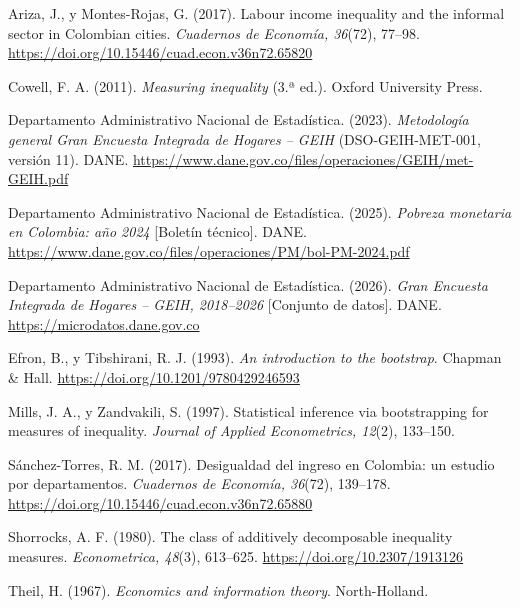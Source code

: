 \documentclass[12pt,letterpaper]{article}
\newenvironment{referencias}{\begin{list}{}{\setlength{\leftmargin}{0.5in}\setlength{\itemindent}{-0.5in}\setlength{\itemsep}{0pt}\setlength{\parsep}{0pt}}\raggedright}{\end{list}}
\begin{document}
\begin{referencias}
  \item Ariza, J., y Montes-Rojas, G. (2017). Labour income inequality and the informal sector in Colombian cities. \emph{Cuadernos de Economía, 36}(72), 77--98. \url{https://doi.org/10.15446/cuad.econ.v36n72.65820}
  \item Cowell, F. A. (2011). \emph{Measuring inequality} (3.ª ed.). Oxford University Press.
  \item Departamento Administrativo Nacional de Estadística. (2023). \emph{Metodología general Gran Encuesta Integrada de Hogares -- GEIH} (DSO-GEIH-MET-001, versión 11). DANE. \url{https://www.dane.gov.co/files/operaciones/GEIH/met-GEIH.pdf}
  \item Departamento Administrativo Nacional de Estadística. (2025). \emph{Pobreza monetaria en Colombia: año 2024} [Boletín técnico]. DANE. \url{https://www.dane.gov.co/files/operaciones/PM/bol-PM-2024.pdf}
  \item Departamento Administrativo Nacional de Estadística. (2026). \emph{Gran Encuesta Integrada de Hogares -- GEIH, 2018--2026} [Conjunto de datos]. DANE. \url{https://microdatos.dane.gov.co}
  \item Efron, B., y Tibshirani, R. J. (1993). \emph{An introduction to the bootstrap}. Chapman \& Hall. \url{https://doi.org/10.1201/9780429246593}
  \item Mills, J. A., y Zandvakili, S. (1997). Statistical inference via bootstrapping for measures of inequality. \emph{Journal of Applied Econometrics, 12}(2), 133--150.
  \item Sánchez-Torres, R. M. (2017). Desigualdad del ingreso en Colombia: un estudio por departamentos. \emph{Cuadernos de Economía, 36}(72), 139--178. \url{https://doi.org/10.15446/cuad.econ.v36n72.65880}
  \item Shorrocks, A. F. (1980). The class of additively decomposable inequality measures. \emph{Econometrica, 48}(3), 613--625. \url{https://doi.org/10.2307/1913126}
  \item Theil, H. (1967). \emph{Economics and information theory}. North-Holland.
\end{referencias}
\end{document}
